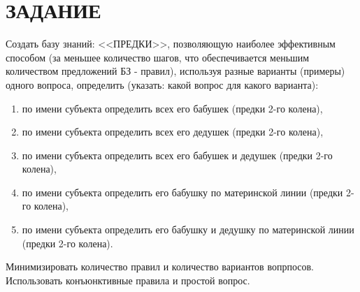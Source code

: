 \section{ЗАДАНИЕ}

Создать базу знаний: <<ПРЕДКИ>>, позволяющую наиболее эффективным способом (за меньшее количество шагов, что обеспечивается меньшим количеством предложений БЗ - правил), используя разные варианты (примеры) одного вопроса, определить (указать: какой вопрос для какого варианта):

\begin{enumerate}
    \item по имени субъекта определить всех его бабушек (предки 2-го колена),
    \item по имени субъекта определить всех его дедушек (предки 2-го колена),
    \item по имени субъекта определить всех его бабушек и дедушек (предки 2-го колена),
    \item по имени субъекта определить его бабушку по материнской линии (предки 2-го колена),
    \item по имени субъекта определить его бабушку и дедушку по материнской линии (предки 2-го колена).
\end{enumerate}

Минимизировать количество правил и количество вариантов вопрпосов. Использовать конъюнктивные правила и простой вопрос.

